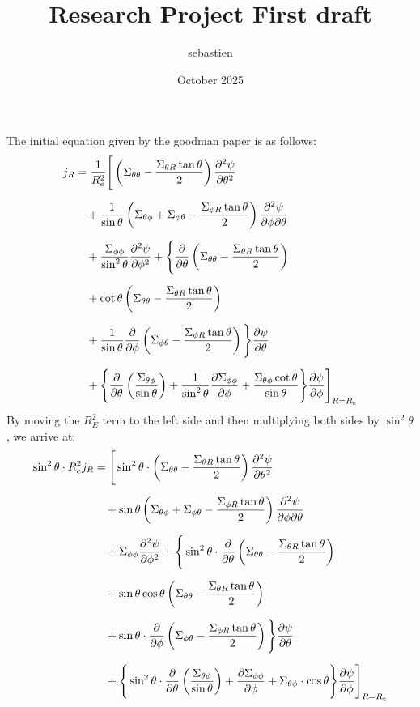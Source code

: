 \documentclass{article}
\title{Research Project First draft}
\author{sebastien } \date{October 2025}
\begin{document}
The initial equation given by the goodman paper is as follows:
\begin{equation*}
	\begin{aligned}
		j_R
		 & = \frac1{R_e^2} \Bigg[
			\left( \Sigma_{\theta\theta} - \frac{\Sigma_{\theta R} \tan\theta}{2} \right)
		\pdv[2]{\psi}{\theta}                                                         \\[6pt]
		 & \quad + \frac1{\sin\theta}
		\left( \Sigma_{\theta\phi} + \Sigma_{\phi\theta} - \frac{\Sigma_{\phi R} \tan\theta}{2} \right)
		\pdv{\psi}{\phi}{\theta}                                                      \\[6pt]
		 & \quad + \frac{\Sigma_{\phi\phi}}{\sin^2\theta}
		\pdv[2]{\psi}{\phi} + \Bigg\{ \pdv{\theta}
		\left( \Sigma_{\theta\theta} - \frac{\Sigma_{\theta R} \tan\theta}{2} \right) \\[6pt]
		 & \quad + \cot\theta
		\left( \Sigma_{\theta\theta} - \frac{\Sigma_{\theta R} \tan\theta}{2} \right) \\[6pt]
		 & \quad + \frac1{\sin\theta} \pdv{\phi}
		\left( \Sigma_{\phi\theta} - \frac{\Sigma_{\phi R} \tan\theta}{2} \right)
		\Bigg\}\pdv{\psi}{\theta}                                                     \\[6pt]
		 & \quad + \Bigg\{\pdv{\theta}
		\left( \frac{\Sigma_{\theta\phi}}{\sin\theta} \right) +
		\frac1{\sin^2\theta}\pdv{\Sigma_{\phi\phi}}{\phi}
		+ \frac{\Sigma_{\theta\phi}\cot\theta}{\sin\theta}
		\Bigg\}\pdv{\psi}{\phi}
		\Bigg]_{R = R_e}
	\end{aligned}
\end{equation*}
By moving the $R_E^2$ term to the left side and then multiplying both sides by $\sin^2\theta$, we arrive at:
\begin{equation*}
	\begin{aligned}
		\sin^2\theta \cdot R_e^2j_R
		 & =  \Bigg[
			\sin^2 \theta \cdot \left( \Sigma_{\theta\theta} - \frac{\Sigma_{\theta R} \tan\theta}{2} \right)
		\pdv[2]{\psi}{\theta}                                                         \\[6pt]
		 & \quad + \sin\theta
		\left( \Sigma_{\theta\phi} + \Sigma_{\phi\theta} - \frac{\Sigma_{\phi R} \tan\theta}{2} \right)
		\pdv{\psi}{\phi}{\theta}                                                      \\[6pt]
		 & \quad + \Sigma_{\phi\phi}
		\pdv[2]{\psi}{\phi} + \Bigg\{
		\sin^2\theta\cdot \pdv{\theta}
		\left( \Sigma_{\theta\theta} - \frac{\Sigma_{\theta R} \tan\theta}{2} \right) \\[6pt]
		 & \quad + \sin \theta\cos\theta
		\left( \Sigma_{\theta\theta} - \frac{\Sigma_{\theta R} \tan\theta}{2} \right) \\[6pt]
		 & \quad + \sin\theta\cdot
		\pdv{\phi}
		\left( \Sigma_{\phi\theta} - \frac{\Sigma_{\phi R} \tan\theta}{2} \right)
		\Bigg\}\pdv{\psi}{\theta}                                                     \\[6pt]
		 & \quad + \Bigg\{\sin^2\theta\cdot\pdv{\theta}
		\left( \frac{\Sigma_{\theta\phi}}{\sin\theta} \right) +
		\pdv{\Sigma_{\phi\phi}}{\phi}
		+ \Sigma_{\theta\phi}\cdot\cos\theta
		\Bigg\}\pdv{\psi}{\phi}
		\Bigg]_{R = R_e}
	\end{aligned}
\end{equation*}
\end{document}
